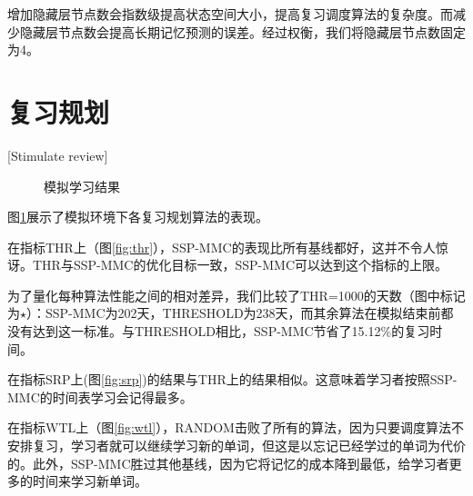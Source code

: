 增加隐藏层节点数会指数级提高状态空间大小，提高复习调度算法的复杂度。而减少隐藏层节点数会提高长期记忆预测的误差。经过权衡，我们将隐藏层节点数固定为4。

\section{复习规划}[Stimulate review]

\begin{figure}[htbp]
    \begin{minipage}{\textwidth}
    \centering
    \subfigure{\label{fig:thr}}\addtocounter{subfigure}{-2}
    \hspace{2em}
    \subfigure{\label{fig:srp}}\addtocounter{subfigure}{-2}
    \end{minipage}
    \centering
    \begin{minipage}{\textwidth}
    \centering
    \subfigure{\label{fig:wtl}}\addtocounter{subfigure}{-2}
    \hspace{2em}
    \subfigure{\label{fig:new}}\addtocounter{subfigure}{-2}
    \end{minipage}
    \vspace{0.2em}
    \caption{模拟学习结果}
    \label{fig:simulation}
\end{figure}

图\ref{fig:simulation}展示了模拟环境下各复习规划算法的表现。

在指标THR上（图\ref{fig:thr}），SSP-MMC的表现比所有基线都好，这并不令人惊讶。THR与SSP-MMC的优化目标一致，SSP-MMC可以达到这个指标的上限。

为了量化每种算法性能之间的相对差异，我们比较了THR=1000的天数（图中标记为$\star$）：SSP-MMC为202天，THRESHOLD为238天，而其余算法在模拟结束前都没有达到这一标准。与THRESHOLD相比，SSP-MMC节省了15.12\%的复习时间。

在指标SRP上(图\ref{fig:srp})的结果与THR上的结果相似。这意味着学习者按照SSP-MMC的时间表学习会记得最多。

在指标WTL上（图\ref{fig:wtl}），RANDOM击败了所有的算法，因为只要调度算法不安排复习，学习者就可以继续学习新的单词，但这是以忘记已经学过的单词为代价的。此外，SSP-MMC胜过其他基线，因为它将记忆的成本降到最低，给学习者更多的时间来学习新单词。

